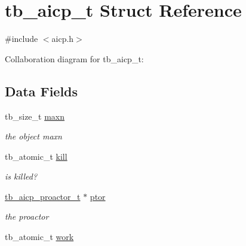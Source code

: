 \hypertarget{structtb__aicp__t}{\section{tb\-\_\-aicp\-\_\-t Struct Reference}
\label{structtb__aicp__t}
}


{\ttfamily \#include $<$aicp.\-h$>$}



Collaboration diagram for tb\-\_\-aicp\-\_\-t\-:
\subsection*{Data Fields}
\begin{DoxyCompactItemize}
\item 
\hypertarget{structtb__aicp__t_ab884696b53a29ea18afe6b5f8ec32597}{tb\-\_\-size\-\_\-t \hyperlink{structtb__aicp__t_ab884696b53a29ea18afe6b5f8ec32597}{maxn}}\label{structtb__aicp__t_ab884696b53a29ea18afe6b5f8ec32597}

\begin{DoxyCompactList}\small\item\em the object maxn \end{DoxyCompactList}\item 
\hypertarget{structtb__aicp__t_af49f1b6e010c9ef5d96b42009829cb6f}{tb\-\_\-atomic\-\_\-t \hyperlink{structtb__aicp__t_af49f1b6e010c9ef5d96b42009829cb6f}{kill}}\label{structtb__aicp__t_af49f1b6e010c9ef5d96b42009829cb6f}

\begin{DoxyCompactList}\small\item\em is killed? \end{DoxyCompactList}\item 
\hypertarget{structtb__aicp__t_aec21317f9793609428f9ba96e9795b4d}{\hyperlink{structtb__aicp__proactor__t}{tb\-\_\-aicp\-\_\-proactor\-\_\-t} $\ast$ \hyperlink{structtb__aicp__t_aec21317f9793609428f9ba96e9795b4d}{ptor}}\label{structtb__aicp__t_aec21317f9793609428f9ba96e9795b4d}

\begin{DoxyCompactList}\small\item\em the proactor \end{DoxyCompactList}\item 
\hypertarget{structtb__aicp__t_a05fc651c69e60f97a0e897580a924411}{tb\-\_\-atomic\-\_\-t \hyperlink{structtb__aicp__t_a05fc651c69e60f97a0e897580a924411}{work}}\label{structtb__aicp__t_a05fc651c69e60f97a0e897580a924411}


\end{DoxyCompactItemize}
